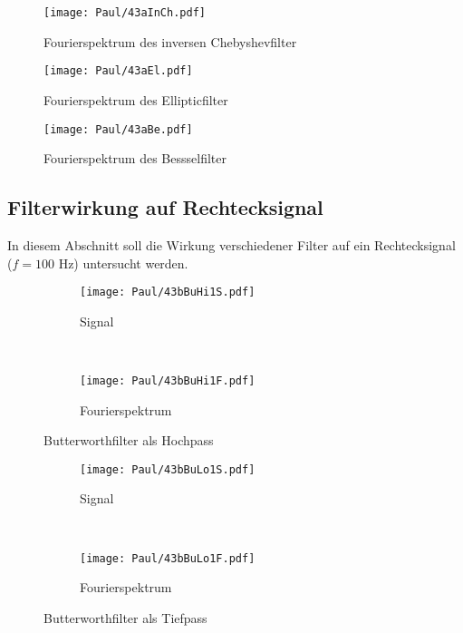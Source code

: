 \newpage
\begin{figure}[h]
    \centering
    \texttt{[image: Paul/43aInCh.pdf]}
    \caption{Fourierspektrum des inversen Chebyshevfilter}
\end{figure}


\begin{figure}[h]
    \centering
    \texttt{[image: Paul/43aEl.pdf]}
    \caption{Fourierspektrum des Ellipticfilter}
\end{figure}

\newpage
\begin{figure}[h]
    \centering
    \texttt{[image: Paul/43aBe.pdf]}
    \caption{Fourierspektrum des Bessselfilter}
\end{figure}

\newpage
\subsection{Filterwirkung auf Rechtecksignal}
In diesem Abschnitt soll die Wirkung verschiedener Filter auf ein Rechtecksignal ($f=100$ Hz) untersucht werden.

\begin{figure}[h]
    \centering
    \begin{subfigure}{\textwidth}
        \centering
        \texttt{[image: Paul/43bBuHi1S.pdf]}
        \caption{Signal}
    \end{subfigure}\\
    \begin{subfigure}{\textwidth}
        \centering
        \texttt{[image: Paul/43bBuHi1F.pdf]}
        \caption{Fourierspektrum}
    \end{subfigure}
    \caption{Butterworthfilter als Hochpass}
\end{figure}


\newpage
\begin{figure}[h]
    \centering
    \begin{subfigure}{\textwidth}
        \centering
        \texttt{[image: Paul/43bBuLo1S.pdf]}
        \caption{Signal}
    \end{subfigure}\\
    \begin{subfigure}{\textwidth}
        \centering
        \texttt{[image: Paul/43bBuLo1F.pdf]}
        \caption{Fourierspektrum}
    \end{subfigure}
    \caption{Butterworthfilter als Tiefpass}
\end{figure}


